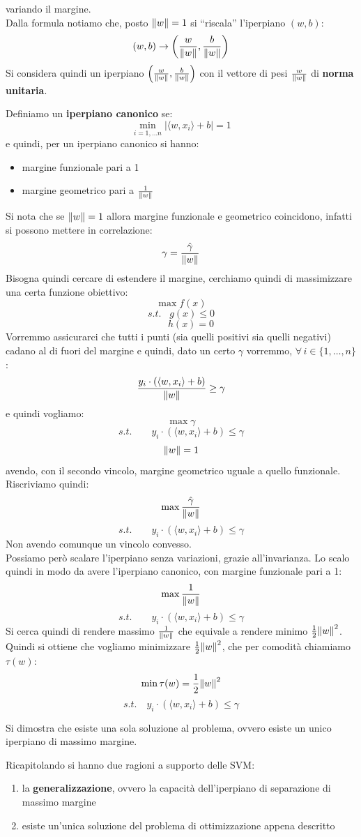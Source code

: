 variando il margine.\\
Dalla formula notiamo che, posto $\norm{w}=1$ si ``riscala'' l'iperpiano $(w, b)$:
\[(w, b)\to\left(\frac{w}{\norm{w}},\frac{b}{\norm{w}}\right)\]
Si considera quindi un iperpiano
$\left(\frac{w}{\norm{w}},\frac{b}{\norm{w}}\right)$ con il vettore di pesi
$\frac{w}{\norm{w}}$ di \textbf{norma unitaria}.
\begin{definizione}
  Definiamo un \textbf{iperpiano canonico} se:
  \[\min_{i=1,\ldots n}|\langle w, x_i\rangle+b|=1\]
  e quindi, per un iperpiano canonico si hanno:
  \begin{itemize}
    \item margine funzionale pari a 1
    \item margine geometrico pari a $\frac{1}{\norm{w}}$
  \end{itemize}
\end{definizione}
Si nota che se $\norm{w}=1$ allora margine funzionale e geometrico coincidono,
infatti si possono mettere in correlazione:
\[\gamma=\frac{\hat{\gamma}}{\norm{w}}\]
Bisogna quindi cercare di estendere il margine, cerchiamo quindi di
massimizzare una certa funzione obiettivo:
\[\max f(x)\]
\[s.t.\,\,\,\,\, g(x)\leq 0\]
\[\qquad h(x)=0\]
Vorremmo assicurarci che tutti i punti (sia quelli positivi sia quelli negativi)
cadano  al di fuori del margine e quindi, dato un certo $\gamma$ vorremmo,
$\forall\, i\in\{1,\ldots, n\}$:
\[\frac{y_i\cdot(\langle w, x_i\rangle+b)}{\norm{w}}\geq \gamma\]
e quindi vogliamo:
\[\max \gamma\]
\[s.t.\qquad y_i\cdot(\langle w, x_i\rangle+b)\leq \gamma\]
\[\norm{w}=1 \]
avendo, con il secondo vincolo,  margine geometrico uguale a quello
funzionale.\\
Riscriviamo quindi:
\[\max \frac{\hat{\gamma}}{\norm{w}}\]
\[s.t.\qquad y_i\cdot(\langle w, x_i\rangle+b)\leq \gamma\]
Non avendo comunque un vincolo convesso.\\
Possiamo però scalare l'iperpiano senza variazioni, grazie all'invarianza. Lo
scalo quindi in modo da avere l'iperpiano canonico, con margine funzionale pari
a 1:
\[\max \frac{1}{\norm{w}}\]
\[s.t.\qquad y_i\cdot(\langle w, x_i\rangle+b)\leq \gamma\]
Si cerca quindi di rendere massimo $\frac{1}{\norm{w}}$ che equivale a rendere
minimo $\frac{1}{2}\norm{w}^2$. Quindi si ottiene che vogliamo minimizzare
$\frac{1}{2}\norm{w}^2$, che per comodità chiamiamo $\tau(w)$:
\[\min \tau(w)=\frac{1}{2}\norm{w}^2\]
\[s.t.\quad y_i\cdot(\langle w, x_i\rangle+b)\leq \gamma\]
\begin{definizione}
  Si dimostra che esiste una sola soluzione al problema, ovvero esiste un unico
  iperpiano di massimo margine.
\end{definizione}
Ricapitolando si hanno due ragioni a supporto delle SVM:
\begin{enumerate}
  \item la \textbf{generalizzazione}, ovvero la capacità dell'iperpiano di
  separazione di massimo margine
  \item esiste un’unica soluzione del problema di ottimizzazione appena
  descritto 
\end{enumerate}


